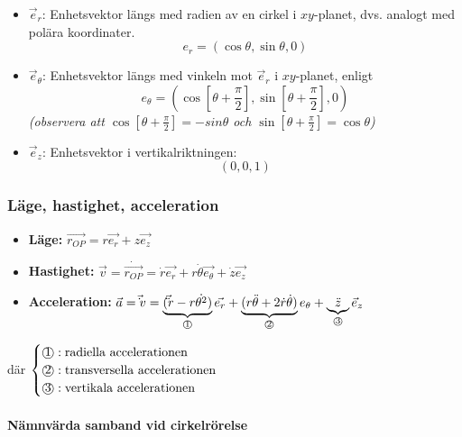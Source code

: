 \documentclass{article}
\newenvironment{ankiflashcard}[1]{}{}
\newcommand{\numbercircle}[1]{
\text{\textcircled{#1}}
}
\newcommand{\numbercirclewithunderbrace}[2]{
\underbrace{#1}_{\numbercircle{#2}}
}
\begin{document}
\begin{paracol}{2}
\begin{ankiflashcard}{Definiera enhetsvektorerna i cylinderkoordinater.}
\begin{itemize}
    \item $\vec e_r$: Enhetsvektor längs med radien av en cirkel i $xy$-planet, dvs. analogt med polära koordinater.
    $$e_r = (\cos \theta, \sin \theta, 0)$$
    \item $\vec e_\theta$: Enhetsvektor längs med vinkeln mot $\vec e_r$ i $xy$-planet, enligt
    $$e_\theta = (\cos \left[\theta + \frac{\pi}{2}\right], \sin \left[\theta + \frac{\pi}{2}\right], 0)$$
    \textit{(observera att $\cos \left[\theta + \frac{\pi}{2}\right]=-sin \theta$ och $\sin \left[\theta + \frac{\pi}{2}\right]=\cos \theta$)}
    \item $\vec e_z$: Enhetsvektor i vertikalriktningen: $$(0,0,1)$$
\end{itemize}
\end{ankiflashcard}

\begin{ankiflashcard}{Definiera läge, hastighet och acceleration i cylinderkoordinater.}
    
\subsubsection{Läge, hastighet, acceleration}
\begin{itemize}
    \item \textbf{Läge:} $\vec{r_{OP}}=r \vec{e_r}+z\vec{e_z}$
    \item \textbf{Hastighet:} $\vec v = \dot \vec{r_{OP}}=\dot r \vec{e_r} + r\dot \theta \vec{e_\theta}+\dot z\vec{e_z}$
    \item \textbf{Acceleration:} $\vec a = \vec \dot v = \numbercirclewithunderbrace{(\vec \ddot r- r\dot{\theta^2})}{1}\vec{e_r}
    +\numbercirclewithunderbrace{(r\ddot \theta + 2\dot r\dot \theta)}{2}e_\theta +\numbercirclewithunderbrace{\ddot z}{3} \vec e_z$
\end{itemize}
där $\begin{cases}
\numbercircle{1}:\space\text{radiella accelerationen}\\
\numbercircle{2}:\space\text{transversella accelerationen}\\
\numbercircle{3}:\space\text{vertikala accelerationen}
\end{cases}$
\end{ankiflashcard}


\paragraph{Nämnvärda samband vid cirkelrörelse}



\end{paracol}
\end{document}

